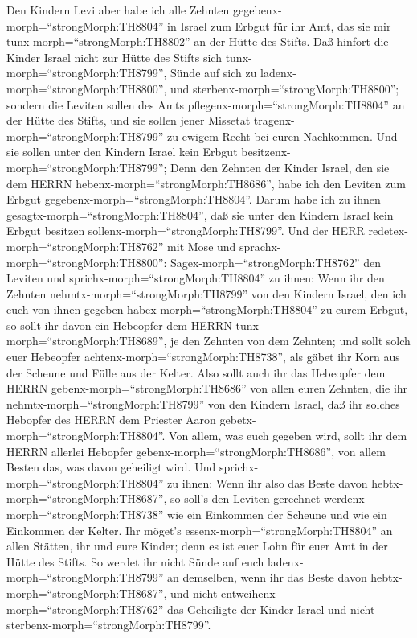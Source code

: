  Den Kindern Levi aber habe ich alle Zehnten
gegebenx-morph=``strongMorph:TH8804'' in Israel zum Erbgut für ihr Amt,
das sie mir tunx-morph=``strongMorph:TH8802'' an der Hütte des Stifts.
 Daß hinfort die Kinder Israel nicht zur Hütte des Stifts
sich tunx-morph=``strongMorph:TH8799'', Sünde auf sich zu
ladenx-morph=``strongMorph:TH8800'', und
sterbenx-morph=``strongMorph:TH8800'';  sondern die Leviten
sollen des Amts pflegenx-morph=``strongMorph:TH8804'' an der Hütte des
Stifts, und sie sollen jener Missetat
tragenx-morph=``strongMorph:TH8799'' zu ewigem Recht bei euren
Nachkommen. Und sie sollen unter den Kindern Israel kein Erbgut
besitzenx-morph=``strongMorph:TH8799'';  Denn den Zehnten
der Kinder Israel, den sie dem HERRN
hebenx-morph=``strongMorph:TH8686'', habe ich den Leviten zum Erbgut
gegebenx-morph=``strongMorph:TH8804''. Darum habe ich zu ihnen
gesagtx-morph=``strongMorph:TH8804'', daß sie unter den Kindern Israel
kein Erbgut besitzen sollenx-morph=``strongMorph:TH8799''. 
Und der HERR redetex-morph=``strongMorph:TH8762'' mit Mose und
sprachx-morph=``strongMorph:TH8800'': 
Sagex-morph=``strongMorph:TH8762'' den Leviten und
sprichx-morph=``strongMorph:TH8804'' zu ihnen: Wenn ihr den Zehnten
nehmtx-morph=``strongMorph:TH8799'' von den Kindern Israel, den ich euch
von ihnen gegeben habex-morph=``strongMorph:TH8804'' zu eurem Erbgut, so
sollt ihr davon ein Hebeopfer dem HERRN
tunx-morph=``strongMorph:TH8689'', je den Zehnten von dem Zehnten;
 und sollt solch euer Hebeopfer
achtenx-morph=``strongMorph:TH8738'', als gäbet ihr Korn aus der Scheune
und Fülle aus der Kelter.  Also sollt auch ihr das
Hebeopfer dem HERRN gebenx-morph=``strongMorph:TH8686'' von allen euren
Zehnten, die ihr nehmtx-morph=``strongMorph:TH8799'' von den Kindern
Israel, daß ihr solches Hebopfer des HERRN dem Priester Aaron
gebetx-morph=``strongMorph:TH8804''.  Von allem, was euch
gegeben wird, sollt ihr dem HERRN allerlei Hebopfer
gebenx-morph=``strongMorph:TH8686'', von allem Besten das, was davon
geheiligt wird.  Und sprichx-morph=``strongMorph:TH8804''
zu ihnen: Wenn ihr also das Beste davon
hebtx-morph=``strongMorph:TH8687'', so soll's den Leviten gerechnet
werdenx-morph=``strongMorph:TH8738'' wie ein Einkommen der Scheune und
wie ein Einkommen der Kelter.  Ihr möget's
essenx-morph=``strongMorph:TH8804'' an allen Stätten, ihr und eure
Kinder; denn es ist euer Lohn für euer Amt in der Hütte des Stifts.
 So werdet ihr nicht Sünde auf euch
ladenx-morph=``strongMorph:TH8799'' an demselben, wenn ihr das Beste
davon hebtx-morph=``strongMorph:TH8687'', und nicht
entweihenx-morph=``strongMorph:TH8762'' das Geheiligte der Kinder Israel
und nicht sterbenx-morph=``strongMorph:TH8799''.

